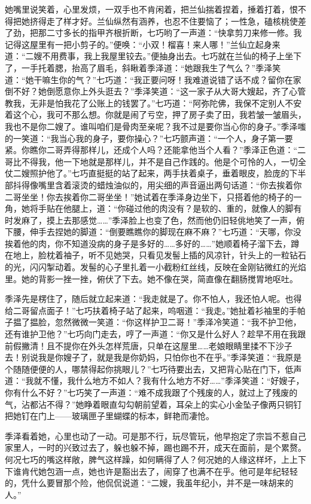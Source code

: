 \par 她嘴里说笑着，心里发烦，一双手也不肯闲着，把兰仙揣着捏着，捶着打着，恨不得把她挤得走了样才好。兰仙纵然有涵养，也忍不住要恼了；一性急，磕核桃使差了劲，把那二寸多长的指甲齐根折断，七巧哟了一声道：“快拿剪刀来修一修。我记得这屋里有一把小剪子的。”便唤：“小双！榴喜！来人哪！”兰仙立起身来道：“二嫂不用费事，我上我屋里铰去。”便抽身出去。七巧就在兰仙的椅子上坐下了，一手托着腮，抬高了眉毛，斜瞅着季泽道：“她跟我生了气么？”季泽笑道：“她干嘛生你的气？”七巧道：“我正要问呀！我难道说错了话不成？留你在家倒不好？她倒愿意你上外头逛去？”季泽笑道：“这一家子从大哥大嫂起，齐了心管教我，无非是怕我花了公账上的钱罢了。”七巧道：“阿弥陀佛，我保不定别人不安着这个心，我可不那么想。你就是闹了亏空，押了房子卖了田，我若皱一皱眉头，我也不是你二嫂了。谁叫咱们是骨肉至亲呢？我不过是要你当心你的身子。”季泽嗤的一笑道：“我当心我的身子，要你操心？”七巧颤声道：“一个人，身子第一要紧。你瞧你二哥弄得那样儿，还成个人吗？还能拿他当个人看？”季泽正色道：“二哥比不得我，他一下地就是那样儿，并不是自己作践的。他是个可怜的人，一切全仗二嫂照护他了。”七巧直挺挺的站了起来，两手扶着桌子，垂着眼皮，脸庞的下半部抖得像嘴里含着滚烫的蜡烛油似的，用尖细的声音逼出两句话道：“你去挨着你二哥坐坐！你去挨着你二哥坐坐！”她试着在季泽身边坐下，只搭着他的椅子的一角，她将手贴在他腿上，道：“你碰过他的肉没有？是软的、重的，就像人的脚有时发麻了，摸上去那感觉……”季泽脸上也变了色，然而他仍旧轻佻地笑了一声，俯下腰，伸手去捏她的脚道：“倒要瞧瞧你的脚现在麻不麻？”七巧道：“天哪，你没挨着他的肉，你不知道没病的身子是多好的……多好的……”她顺着椅子溜下去，蹲在地上，脸枕着袖子，听不见她哭，只看见发髻上插的风凉针，针头上的一粒钻石的光，闪闪掣动着。发髻的心子里扎着一小截粉红丝线，反映在金刚钻微红的光焰里。她的背影一挫一挫，俯伏了下去。她不像在哭，简直像在翻肠搅胃地呕吐。
\par 季泽先是楞住了，随后就立起来道：“我走就是了。你不怕人，我还怕人呢。也得给二哥留点面子！”七巧扶着椅子站了起来，呜咽道：“我走。”她扯着衫袖里的手帕子揾了揾脸，忽然微微一笑道：“你这样护卫二哥！”季泽冷笑道：“我不护卫他，还有谁护卫他？”七巧向门走去，哼了一声道：“你又是什么好人？趁早不用在我跟前假撇清！且不提你在外头怎样荒唐，只单在这屋里……老娘眼睛里揉不下沙子去！别说我是你嫂子了，就是我是你奶妈，只怕你也不在乎。”季泽笑道：“我原是个随随便便的人，哪禁得起你挑眼儿？”七巧待要出去，又把背心贴在门下，低声道：“我就不懂，我什么地方不如人？我有什么地方不好……”季泽笑道：“好嫂子，你有什么不好？”七巧笑了一声道：“难不成我跟了个残废的人，就过上了残废的气，沾都沾不得？”她睁着眼直勾勾朝前望着，耳朵上的实心小金坠子像两只铜钉把她钉在门上——玻璃匣子里蝴蝶的标本，鲜艳而凄怆。
\par 季泽看着她，心里也动了一动。可是那不行，玩尽管玩，他早抱定了宗旨不惹自己家里人，一时的兴致过去了，躲也躲不掉，踢也踢不开，成天在面前，是个累赘。何况七巧的嘴这样敞，脾气这样躁，如何瞒得了人？何况她的人缘这样坏，上上下下谁肯代她包涵一点，她也许是豁出去了，闹穿了也满不在乎。他可是年纪轻轻的，凭什么要冒那个险，他侃侃说道：“二嫂，我虽年纪小，并不是一味胡来的人。”
